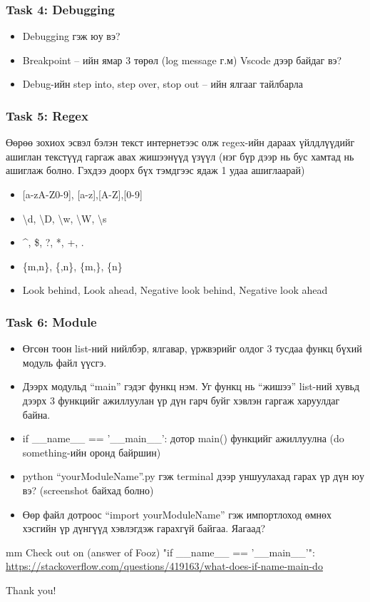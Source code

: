 \documentclass{beamer}
\begin{document}
\begin{frame}
    \frametitle{Task 4: Debugging}
    \begin{itemize}
        \item Debugging гэж юу вэ?
        \item Breakpoint – ийн ямар 3 төрөл (log message г.м) Vscode дээр байдаг вэ?
        \item Debug-ийн step into, step over, stop out – ийн ялгааг тайлбарла 
    \end{itemize}
\end{frame}

\begin{frame}
    \frametitle{Task 5: Regex}
    Өөрөө зохиох эсвэл бэлэн текст интернетээс олж regex-ийн 
    дараах үйлдлүүдийг ашиглан текстүүд гаргаж авах жишээнүүд үзүүл 
    (нэг бүр дээр нь бус хамтад нь ашиглаж болно. Гэхдээ доорх бүх тэмдгээс ядаж 1 удаа ашиглаарай)

    \begin{itemize}
        \item {[a-zA-Z0-9], [a-z],[A-Z],[0-9]}
        \item \textbackslash d, \textbackslash D, \textbackslash w, \textbackslash W, \textbackslash s
        \item \^{}, \$, ?, *, +, .
        \item \{m,n\}, \{,n\}, \{m,\}, \{n\}
        \item Look behind, Look ahead, Negative look behind, Negative look ahead
    \end{itemize}
\end{frame}

\begin{frame}
    \frametitle{Task 6: Module}   
\tiny
    \begin{itemize}
        \item Өгсөн тоон list-ний нийлбэр, ялгавар, үржвэрийг олдог 3 тусдаа функц бүхий модуль файл үүсгэ. 
        \item Дээрх модульд “main” гэдэг функц нэм. Уг функц нь “жишээ” list-ний хувьд дээрх 3 функцийг ажиллуулан үр дүн гарч буйг хэвлэн гаргаж харуулдаг байна.
        \item if {\_\_name\_\_ == '\_\_main\_\_'}: дотор main() функцийг ажиллуулна (do something-ийн оронд байршин)
        \item python  “yourModuleName”.py гэж terminal дээр уншуулахад гарах үр дүн юу вэ? (screenshot байхад болно)
        \item Өөр файл дотроос “import yourModuleName” гэж импортлоход өмнөх хэсгийн үр дүнгүүд хэвлэгдэж гарахгүй байгаа. Яагаад?        
    \end{itemize}

 mm
    Check out on (answer of Fooz) "if \_\_name\_\_ == '\_\_main\_\_'": \\
    \url{https://stackoverflow.com/questions/419163/what-does-if-name-main-do}

\end{frame}

\begin{frame}
\Huge{\centerline{Thank you!}}
\end{frame}

\end{document}
